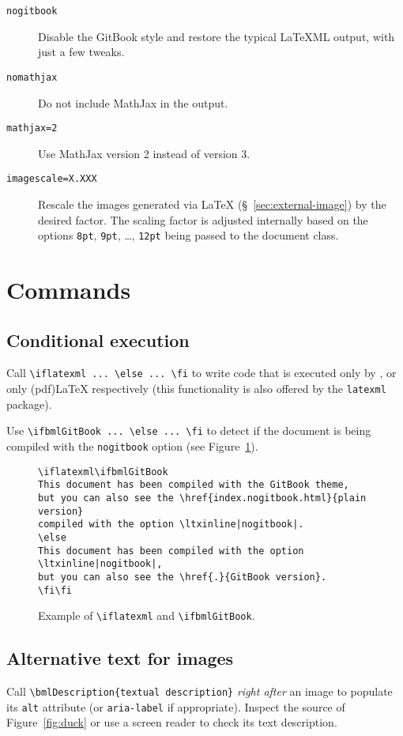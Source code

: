 \documentclass[a4paper,british]{article}
\def\ltxinline{\lstinline[style=bookml]}
\def\htmlinline{\lstinline[language=html]}
\begin{document}
\begin{description}
  \item[\texttt{nogitbook}] Disable the GitBook style and restore the typical LaTeXML output, with just a few tweaks.
  \item[\texttt{nomathjax}] Do not include MathJax in the output.
  \item[\texttt{mathjax=2}] Use MathJax version 2 instead of version 3.
  \item[\texttt{imagescale=X.XXX}] Rescale the images generated via \LaTeX{} (\S~\ref{sec:external-image}) by the desired factor. The scaling factor is adjusted internally based on the options \ltxinline|8pt|, \ltxinline|9pt|, \dots, \ltxinline|12pt| being passed to the document class.
\end{description}

\section{Commands}

\subsection{Conditional execution}
Call \ltxinline|\iflatexml ... \else ... \fi| to write code that is executed only by \LaTeXML{}, or only (pdf)\LaTeX{} respectively (this functionality is also offered by the \ltxinline|latexml| package).

Use \ltxinline|\ifbmlGitBook ... \else ... \fi| to detect if the document is being compiled with the \ltxinline|nogitbook| option (see Figure~\ref{fig:ifbmlGitBook}).

\begin{figure}[hb]
  \begin{lstlisting}[style=bookml]
\iflatexml\ifbmlGitBook
This document has been compiled with the GitBook theme,
but you can also see the \href{index.nogitbook.html}{plain version}
compiled with the option \ltxinline|nogitbook|.
\else
This document has been compiled with the option \ltxinline|nogitbook|,
but you can also see the \href{.}{GitBook version}.
\fi\fi
  \end{lstlisting}
  \caption{Example of \texttt{\textbackslash{}iflatexml} and \texttt{\textbackslash{}ifbmlGitBook}.}
  \label{fig:ifbmlGitBook}
\end{figure}

\subsection{Alternative text for images}
Call \ltxinline|\bmlDescription{textual description}| \emph{right after} an image to populate its \htmlinline|alt| attribute (or \ltxinline|aria-label| if appropriate). Inspect the \HTML{} source of Figure~\ref{fig:duck} or use a screen reader to check its text description.
\end{document}

